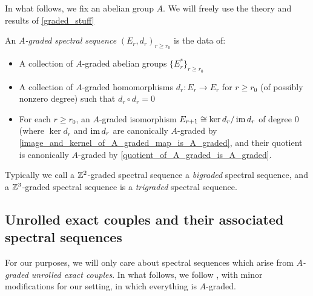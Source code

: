 \documentclass[../main.tex]{subfiles}
\begin{document}
In what follows, we fix an abelian group $A$. We will freely use the theory and results of \autoref{graded_stuff}

\begin{definition}
    An \emph{$A$-graded spectral sequence} $(E_r,d_r)_{r\geq r_0}$ is the data of:\begin{itemize}
        \item A collection of $A$-graded abelian groups $\{E_r^{*}\}_{r\geq r_0}$
        \item A collection of $A$-graded homomorphisms $d_r:E_r\to E_r$ for $r\ge r_0$ (of possibly nonzero degree) such that $d_r\circ d_r=0$ 
        \item For each $r\geq r_0$, an $A$-graded isomorphism $E_{r+1}\cong\ker d_r/\operatorname{im} d_r$ of degree $0$ (where $\ker d_r$ and $\operatorname{im} d_r$ are canonically $A$-graded by \autoref{image_and_kernel_of_A_graded_map_is_A_graded}, and their quotient is canonically $A$-graded by \autoref{quotient_of_A_graded_is_A_graded}.
    \end{itemize}
\end{definition}

Typically we call a $\mathbb{Z}^2$-graded spectral sequence a \emph{bigraded} spectral sequence, and a $\mathbb{Z}^3$-graded spectral sequence is a \emph{trigraded} spectral sequence.


\subsection{Unrolled exact couples and their associated spectral sequences}

For our purposes, we will only care about spectral sequences which arise from \emph{$A$-graded unrolled exact couples}. In what follows, we follow \cite{Boardman_1999}, with minor modifications for our setting, in which everything is $A$-graded.
\end{document}
